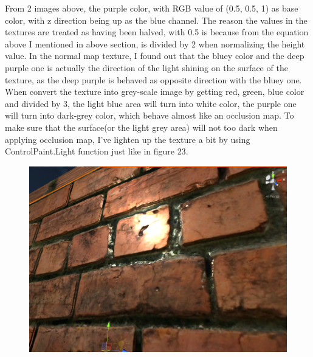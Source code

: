 \documentclass[a4paper, 13pt]{extarticle}
\begin{document}
{\begin{figure}[h]
{\begin{minipage}{.4\textwidth}
			\centering
			\label{fig:test23}
		\end{minipage}
	}
\end{figure}
\vspace{5.5cm}
From 2 images above, the purple color, with RGB value of (0.5, 0.5, 1) as base color, with z direction being up as the blue channel. The reason the values in the textures are treated as having been halved, with 0.5 is because from the equation above I mentioned in above section, is divided by 2 when normalizing the height value. In the normal map texture, I found out that the bluey color and the deep purple one is actually the direction of the light shining on the surface of the texture, as the deep purple is behaved as opposite direction with the bluey one. When convert the texture into grey-scale image by getting red, green, blue color and divided by 3, the light blue area will turn into white color, the purple one will turn into dark-grey color, which behave almost like an occlusion map. To make sure that the surface(or the light grey area) will not too dark when applying occlusion map, I've lighten up the texture a bit by using ControlPaint.Light function just like in figure 23. 
\begin{figure}[h]
	\begin{minipage}{.4\textwidth}
		\centering
		\includegraphics[width=1\linewidth]{intructions/without_occlusion.png}
		\centering
		\label{fig:test24}
	\end{minipage}
	\begin{minipage}{.45\textwidth}
		\centering

\end{minipage}
\end{figure}}
\end{document}
